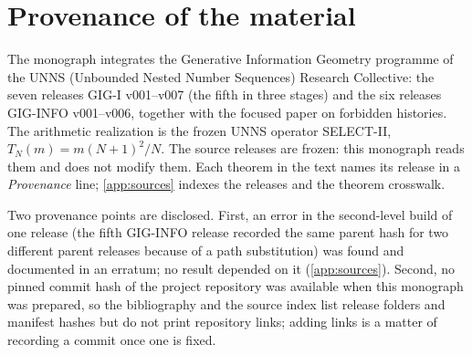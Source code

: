 \section{Provenance of the material}\label{sec:provenance}
The monograph integrates the Generative Information Geometry programme of the UNNS (Unbounded Nested Number Sequences) Research Collective: the seven releases GIG-I v001--v007 (the fifth in three stages) and the six releases GIG-INFO v001--v006, together with the focused paper on forbidden histories. The arithmetic realization is the frozen UNNS operator SELECT-II, $T_N(m)=m(N{+}1)^2/N$. The source releases are frozen: this monograph reads them and does not modify them. Each theorem in the text names its release in a \emph{Provenance} line; \cref{app:sources} indexes the releases and the theorem crosswalk.

Two provenance points are disclosed. First, an error in the second-level build of one release (the fifth GIG-INFO release recorded the same parent hash for two different parent releases because of a path substitution) was found and documented in an erratum; no result depended on it (\cref{app:sources}). Second, no pinned commit hash of the project repository was available when this monograph was prepared, so the bibliography and the source index list release folders and manifest hashes but do not print repository links; adding links is a matter of recording a commit once one is fixed.

